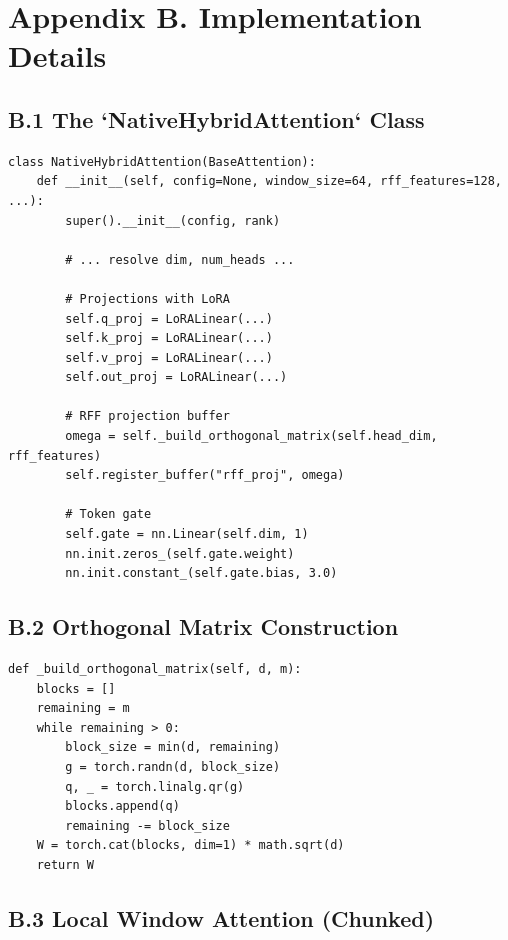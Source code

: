
\section{Appendix B. Implementation Details}

\subsection{B.1 The `NativeHybridAttention` Class}

\begin{lstlisting}
class NativeHybridAttention(BaseAttention):
    def __init__(self, config=None, window_size=64, rff_features=128, ...):
        super().__init__(config, rank)
        
        # ... resolve dim, num_heads ...
        
        # Projections with LoRA
        self.q_proj = LoRALinear(...)
        self.k_proj = LoRALinear(...)
        self.v_proj = LoRALinear(...)
        self.out_proj = LoRALinear(...)
        
        # RFF projection buffer
        omega = self._build_orthogonal_matrix(self.head_dim, rff_features)
        self.register_buffer("rff_proj", omega)
        
        # Token gate
        self.gate = nn.Linear(self.dim, 1)
        nn.init.zeros_(self.gate.weight)
        nn.init.constant_(self.gate.bias, 3.0)
\end{lstlisting}

\subsection{B.2 Orthogonal Matrix Construction}

\begin{lstlisting}
def _build_orthogonal_matrix(self, d, m):
    blocks = []
    remaining = m
    while remaining > 0:
        block_size = min(d, remaining)
        g = torch.randn(d, block_size)
        q, _ = torch.linalg.qr(g)
        blocks.append(q)
        remaining -= block_size
    W = torch.cat(blocks, dim=1) * math.sqrt(d)
    return W
\end{lstlisting}

\subsection{B.3 Local Window Attention (Chunked)}

